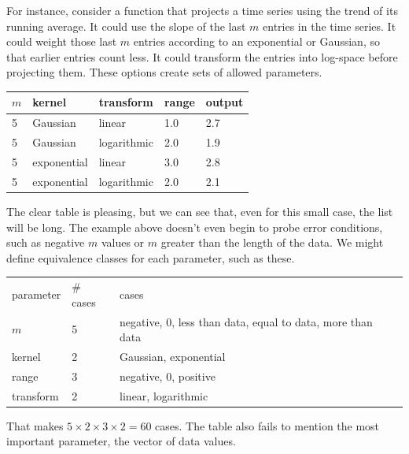 \documentclass[fleqn,10pt]{olplainarticle}
\begin{document}
For instance, consider a function that projects a time series
using the trend of its running average. It could use the slope
of the last $m$ entries in the time series. It could weight
those last $m$ entries according to an exponential or Gaussian, so that
earlier entries count less. It could transform the entries
into log-space before projecting them. These options create
sets of allowed parameters.
\begin{center}
\begin{tabular}{|l|l|l|l|l|}\hline
$m$ & kernel & transform & range & output \\ \hline
5 & Gaussian & linear & 1.0 & 2.7 \\
5 & Gaussian & logarithmic & 2.0 & 1.9 \\
5 & exponential & linear & 3.0 & 2.8 \\
5 & exponential & logarithmic & 2.0 & 2.1 \\ \hline
\end{tabular}
\end{center}
The clear table is pleasing, but we can see that, even for
this small case, the list will be long. The example
above doesn't even begin to probe error conditions, such
as negative $m$ values or $m$ greater than the length
of the data. We might define equivalence classes for each
parameter, such as these.
\begin{center}
\begin{tabular}{|l|l|l|}\hline
parameter & \# cases & cases \\
$m$ & 5 & negative, 0, less than data, equal to data, more than data \\
kernel & 2 & Gaussian, exponential \\
range & 3 & negative, 0, positive \\
transform & 2 & linear, logarithmic \\ \hline
\end{tabular}
\end{center}
That makes $5 \times 2 \times 3\times 2 = 60$ cases.
The table also fails to mention the most important
parameter, the vector of data values.
\end{document}
